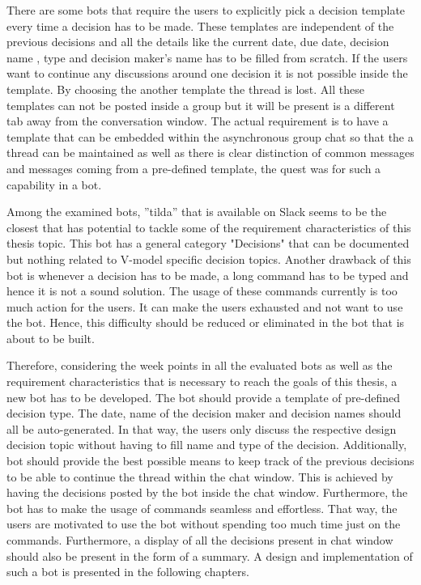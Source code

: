 There are some bots that require the users to explicitly pick a decision template every time a decision has to be made. These templates are independent of the previous decisions and all the details like the current date, due date, decision name , type and decision maker's name has to be filled from scratch. If the users want to continue any discussions around one decision it is not possible inside the template. By choosing the another template the thread is lost. All these templates can not be posted inside a group but it will be present is a different tab away from the conversation window. The actual requirement is to have a template that can be embedded within the asynchronous group chat so that the a thread can be maintained as well as there is clear distinction of common messages and messages coming from a pre-defined template, the quest was for such a capability in a bot. 


Among the examined bots, ”tilda” that is available on Slack seems to be the closest that has potential to tackle some of the requirement characteristics of this thesis topic. This bot has a general category "Decisions" that can be documented but nothing related to V-model specific decision topics. Another drawback of this bot is whenever a decision has to be made, a long command has to be typed and hence it is not a sound solution. The usage of these commands currently is too much action for the users. It can make the users exhausted and not want to use the bot. Hence, this difficulty should be reduced or eliminated in the bot that is about to be built. 

Therefore, considering the week points in all the evaluated bots as well as the requirement characteristics that is necessary to reach the goals of this thesis, a new bot has to be developed. The bot should provide a template of pre-defined decision type. The date, name of the decision maker and decision names should all be auto-generated. In that way, the users only discuss the respective design decision topic without having to fill name and type of the decision. Additionally, bot should provide the best possible means to keep track of the previous decisions to be able to continue the thread within the chat window. This is achieved by having the decisions posted by the bot inside the chat window. Furthermore, the bot has to make the usage of commands seamless and effortless. That way, the users are motivated to use the bot without spending too much time just on the commands. Furthermore, a display of all the decisions present in chat window should also be present in the form of a summary. A design and implementation of such a bot is presented in the following chapters.

